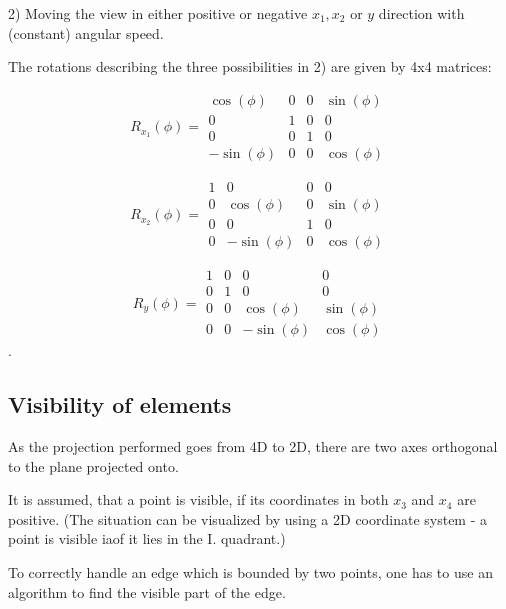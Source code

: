 \documentclass[titlepage]{scrartcl}
\begin{document}
2) Moving the view in either positive or negative $x_1, x_2$ or $y$ direction with (constant) angular speed. 

The rotations describing the three possibilities in 2) are given by 4x4 matrices: 

\begin{equation}
R_{x_1}(\phi) = \begin{array}{cccc}
\cos(\phi) & 0 & 0 & \sin(\phi) \\ 
0 & 1 & 0 & 0 \\ 
0 & 0 & 1 & 0 \\ 
-\sin(\phi) & 0 & 0 & \cos(\phi)
\end{array} 
\end{equation}

\begin{equation}
R_{x_2}(\phi) = \begin{array}{cccc}
1 & 0 & 0 & 0 \\ 
0 & \cos(\phi) & 0 & \sin(\phi) \\ 
0 & 0 & 1 & 0 \\ 
0 & -\sin(\phi) & 0 & \cos(\phi)
\end{array} 
\end{equation}

\begin{equation}
R_{y}(\phi) = \begin{array}{cccc}
1 & 0 & 0 & 0\\ 
0 & 1 & 0 & 0 \\ 
0 & 0 & \cos(\phi) & \sin(\phi) \\ 
0 & 0 & -\sin(\phi) & \cos(\phi)
\end{array} 
\end{equation}.

\subsection{Visibility of elements}

As the projection performed goes from 4D to 2D, there are two axes orthogonal to the plane projected onto. 

It is assumed, that a point is visible, if its coordinates in both $x_3$ and $x_4$ are positive. (The situation can be visualized by using a 2D coordinate system - a point is visible iaof it lies in the I. quadrant.)

To correctly handle an edge which is bounded by two points, one has to use an algorithm to find the visible part of the edge. 
\end{document}
